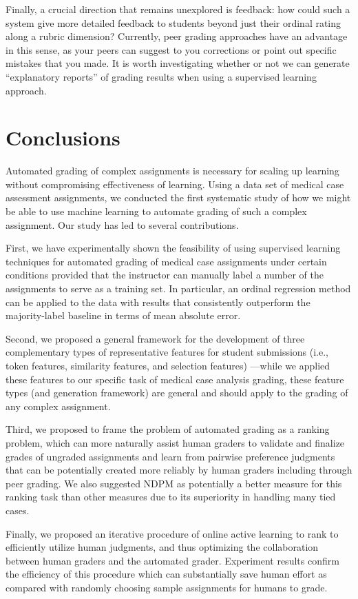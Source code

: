 Finally, a crucial direction that remains unexplored is feedback: how could
such a system give more detailed feedback to students beyond just their
ordinal rating along a rubric dimension? Currently, peer grading approaches
have an advantage in this sense, as your peers can suggest to you
corrections or point out specific mistakes that you made. It is worth
investigating whether or not we can generate ``explanatory reports'' of
grading results when using a supervised learning approach.

\section{Conclusions}

Automated grading of complex assignments is necessary for scaling up
learning without compromising effectiveness of learning. Using a data set
of medical case assessment assignments, we conducted the first systematic
study of how we might be able to use machine learning to automate grading
of such a complex assignment. Our study has led to several contributions.

First, we have experimentally shown the feasibility of using supervised
learning techniques for automated grading of medical case assignments under
certain conditions provided that the instructor can manually label a number
of the assignments to serve as a training set. In particular, an ordinal
regression method can be applied to the data with results that consistently
outperform the majority-label baseline in terms of mean absolute error.

Second, we proposed a general framework for the development of three
complementary types of representative features for student submissions
(i.e., token features, similarity features, and selection features)
---while we applied these features to our specific task of medical case
analysis grading, these feature types (and generation framework) are
general and should apply to the grading of any complex assignment.

Third, we proposed to frame the problem of automated grading as a ranking
problem, which can more naturally assist human graders to validate and
finalize grades of ungraded assignments and learn from pairwise preference
judgments that can be potentially created more reliably by human graders
including through peer grading. We also suggested NDPM as potentially a
better measure for this ranking task than other measures due to its
superiority in handling many tied cases.

Finally, we proposed an iterative procedure of online active learning to
rank to efficiently utilize human judgments, and thus optimizing the
collaboration between human graders and the automated grader. Experiment
results confirm the efficiency of this procedure which can substantially
save human effort as compared with randomly choosing sample assignments for
humans to grade.
